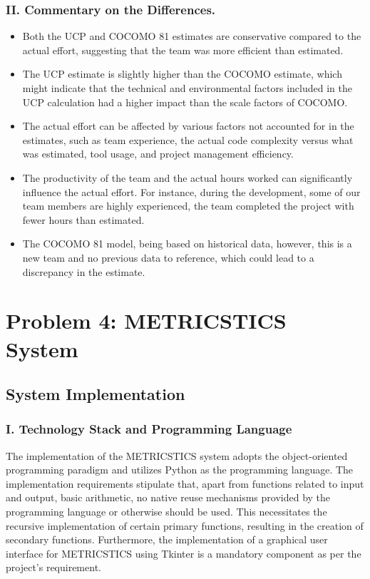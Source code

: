 \documentclass[english,12pt,a4paper]{report}
\begin{document}
		\subsection*{II. Commentary on the Differences.}
			\begin{itemize}[leftmargin=*]
				\item Both the UCP and COCOMO 81 estimates are conservative compared to the actual effort, suggesting that the team was more efficient than estimated.
				
				\item The UCP estimate is slightly higher than the COCOMO estimate, which might indicate that the technical and environmental factors included in the UCP calculation had a higher impact than the scale factors of COCOMO.
				
				\item The actual effort can be affected by various factors not accounted for in the estimates, such as team experience, the actual code complexity versus what was estimated, tool usage, and project management efficiency.
				
				\item The productivity of the team and the actual hours worked can significantly influence the actual effort. For instance, during the development, some of our team members are highly experienced, the team completed the project with fewer hours than estimated.
				
				\item The COCOMO 81 model, being based on historical data, however, this is a new team and no previous data to reference, which could lead to a discrepancy in the estimate.
			\end{itemize}
	
	
	\chapter{Problem 4: METRICSTICS System}
	\section{System Implementation}
		\subsection*{I. Technology Stack and Programming Language}
		
		The implementation of the METRICSTICS system adopts the object-oriented programming paradigm and utilizes Python as the programming language. The implementation requirements stipulate that, apart from functions related to input and output, basic arithmetic, no native reuse mechanisms provided by the programming language or otherwise should be used. This necessitates the recursive implementation of certain primary functions, resulting in the creation of secondary functions. Furthermore, the implementation of a graphical user interface for METRICSTICS using Tkinter is a mandatory component as per the project's requirement.
		
\end{document}
